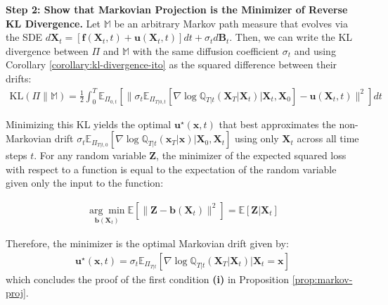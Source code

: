 \documentclass{article}
\begin{document}
\textbf{Step 2: Show that Markovian Projection is the Minimizer of Reverse KL Divergence. }
Let $\mathbb{M}$ be an arbitrary Markov path measure that evolves via the SDE $d\boldsymbol{X}_t=[\boldsymbol{f}(\boldsymbol{X}_t,t)+\boldsymbol{u}(\boldsymbol{X}_t,t)]dt+\sigma_td\boldsymbol{B}_t$. Then, we can write the KL divergence between $\Pi$ and $\mathbb{M}$ with the same diffusion coefficient $\sigma_t$ and using Corollary \ref{corollary:kl-divergence-ito} as the squared difference between their drifts:
\begin{align}
    \text{KL}(\Pi\|\mathbb{M})=\frac{1}{2}\int_0^T\mathbb{E}_{\Pi_{0,t}}\left[\|\sigma_t\mathbb{E}_{\Pi_{T|0,t}}\left[\nabla \log \mathbb{Q}_{T|t}(\boldsymbol{X}_T|\boldsymbol{X}_t)\big|\boldsymbol{X}_t, \boldsymbol{X}_0\right]-\boldsymbol{u}(\boldsymbol{X}_t,t)\|^2\right]dt
\end{align}

Minimizing this KL yields the optimal $\boldsymbol{u}^\star(\boldsymbol{x}, t)$ that best approximates the non-Markovian drift $\sigma_t\mathbb{E}_{\Pi_{T|t,0}}\left[\nabla\log \mathbb{Q}_{T|t}(\boldsymbol{x}_T|\boldsymbol{x})\big|\boldsymbol{X}_0, \boldsymbol{X}_t\right]$ using only $\boldsymbol{X}_t$ across all time steps $t$. For any random variable $\boldsymbol{Z}$, the minimizer of the expected squared loss with respect to a function is equal to the expectation of the random variable given only the input to the function:
\begin{small}
\begin{align}
    \underset{\boldsymbol{b}(\boldsymbol{X}_t)}{\arg\min}\mathbb{E}[\|\boldsymbol{Z}-\boldsymbol{b}(\boldsymbol{X}_t)\|^2]=\mathbb{E}[\boldsymbol{Z}|\boldsymbol{X}_t]
\end{align}
\end{small}
Therefore, the minimizer is the optimal Markovian drift given by:
\begin{align}
    \boldsymbol{u}^\star(\boldsymbol{x},t)=\sigma_t\mathbb{E}_{\Pi_{T|t}}\left[\nabla\log \mathbb{Q}_{T|t}(\boldsymbol{X}_T|\boldsymbol{X}_t)\big|\boldsymbol{X}_t=\boldsymbol{x}\right]
\end{align}
which concludes the proof of the first condition \textbf{(i)} in Proposition \ref{prop:markov-proj}. 
\end{document}
